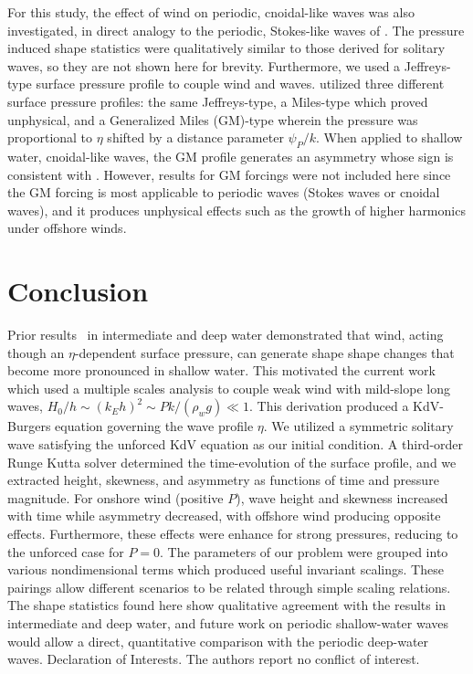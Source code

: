 \documentclass{jfm}
\begin{document}
For this study, the effect of wind on periodic, cnoidal-like waves was
also investigated, in direct analogy to the periodic, Stokes-like waves
of \citet{zdyrski2020wind}.
The pressure induced shape statistics were qualitatively similar to
those derived for solitary waves, so they are not shown here for
brevity.
Furthermore, we used a Jeffreys-type surface pressure profile to
couple wind and waves.
 utilized three different surface pressure
profiles: the same Jeffreys-type, a Miles-type which proved unphysical,
and a Generalized Miles (GM)-type wherein the pressure was proportional to
$\eta$ shifted by a distance parameter $\psi_P/k$.
When applied to shallow water, cnoidal-like waves, the GM profile
generates an asymmetry whose sign is consistent with
\citet{zdyrski2020wind}.
However, results for GM forcings were not included here since the GM
forcing is most applicable to periodic waves (\eg Stokes waves or
cnoidal waves), and it produces unphysical effects such as the growth of
higher harmonics under offshore winds.

\section{Conclusion}
Prior results~\citep{zdyrski2020wind} in intermediate and deep water
demonstrated that wind, acting though an $\eta$-dependent surface
pressure, can generate shape shape changes that become more pronounced
in shallow water.
This motivated the current work which used a multiple scales analysis to
couple weak wind with mild-slope long waves, \ie $H_0/h \sim (k_E h)^2
\sim P k/(\rho_w g) \ll 1$.
This derivation produced a KdV-Burgers equation governing the wave
profile $\eta$.
We utilized a symmetric solitary wave satisfying the unforced KdV
equation as our initial condition.
A third-order Runge Kutta solver determined the time-evolution of the
surface profile, and we extracted height, skewness, and asymmetry as
functions of time and pressure magnitude.
For onshore wind (positive $P$), wave height and skewness increased with
time while asymmetry decreased, with offshore wind producing opposite
effects.
Furthermore, these effects were enhance for strong pressures, reducing
to the unforced case for $P=0$.
The parameters of our problem were grouped into various nondimensional
terms which produced useful invariant scalings.
These pairings allow different scenarios to be related through simple
scaling relations.
The shape statistics found here show qualitative agreement with the
results in intermediate and deep water, and future work on periodic
shallow-water waves would allow a direct, quantitative comparison with
the periodic deep-water waves.
Declaration of Interests. The authors report no conflict of interest.

\appendix



\end{document}

